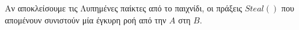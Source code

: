\begin{proofsketch}
  Αν αποκλείσουμε τις Λυπημένες παίκτες από το παιχνίδι, οι πράξεις $Steal\left(\right)$ που απομένουν συνιστούν μία έγκυρη
  ροή από την $A$ στη $B$.
\end{proofsketch}
